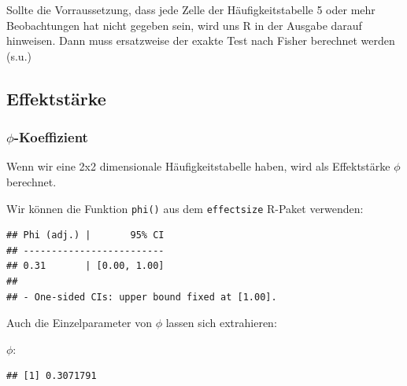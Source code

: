 \documentclass[
]{book}
\newenvironment{Shaded}{\begin{snugshade}}{\end{snugshade}}
\newcommand{\FunctionTok}[1]{\textcolor[rgb]{0.13,0.29,0.53}{\textbf{#1}}}
\newcommand{\NormalTok}[1]{#1}
\newcommand{\SpecialCharTok}[1]{\textcolor[rgb]{0.81,0.36,0.00}{\textbf{#1}}}
\begin{document}
Sollte die Vorraussetzung, dass jede Zelle der Häufigkeitstabelle 5 oder mehr Beobachtungen hat nicht gegeben sein, wird uns R in der Ausgabe darauf hinweisen. Dann muss ersatzweise der exakte Test nach Fisher berechnet werden (s.u.)

\subsection{Effektstärke}\label{effektstuxe4rke-5}

\subsubsection{\texorpdfstring{\(\phi\)-Koeffizient}{\textbackslash phi-Koeffizient}}\label{phi-koeffizient}

Wenn wir eine 2x2 dimensionale Häufigkeitstabelle haben, wird als Effektstärke \(\phi\) berechnet.

Wir können die Funktion \texttt{phi()} aus dem \texttt{effectsize} R-Paket verwenden:

\begin{Shaded}
\end{Shaded}

\begin{verbatim}
## Phi (adj.) |       95% CI
## -------------------------
## 0.31       | [0.00, 1.00]
## 
## - One-sided CIs: upper bound fixed at [1.00].
\end{verbatim}

Auch die Einzelparameter von \(\phi\) lassen sich extrahieren:

\(\phi\):

\begin{Shaded}
\end{Shaded}

\begin{verbatim}
## [1] 0.3071791
\end{verbatim}
\end{document}
